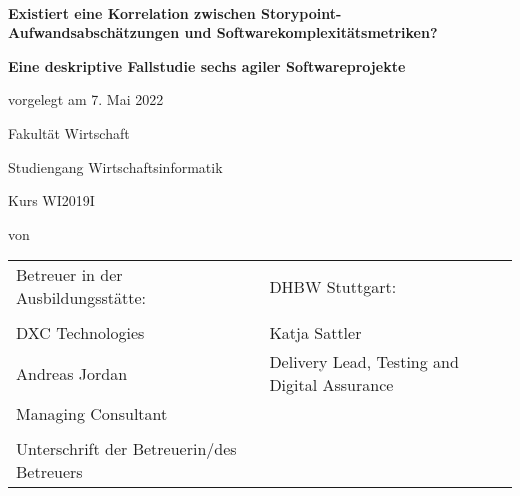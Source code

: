 \begin{spacing}{1}
\begin{center}	
~\vspace{0mm}

{\sffamily
\Large
\textbf{Existiert eine Korrelation zwischen Storypoint-Aufwandsabschätzungen und Softwarekomplexitätsmetriken? }

\bigskip
\textbf{Eine deskriptive Fallstudie sechs agiler Softwareprojekte}
}


\vspace{15mm}

{\Large \typMeinerArbeit}

\vspace{1cm}

vorgelegt am 7. Mai 2022

\vspace{15mm}

Fakultät Wirtschaft
\medskip

Studiengang Wirtschaftsinformatik
\medskip

Kurs WI2019I 

\vspace{10mm}

von

\vspace{10mm}

{\large\textsc{\meinName}}

\vspace{10mm}
\end{center}

\vfill

\begin{tabular}{ll}
Betreuer in der Ausbildungsstätte: & DHBW Stuttgart: \\
\hspace{0.4\linewidth} & \\
DXC Technologies & Katja Sattler \\
Andreas Jordan & Delivery Lead, Testing and Digital Assurance \\
Managing Consultant \\
\\
Unterschrift der Betreuerin/des Betreuers \\
\end{tabular}


\vspace{1cm}
\end{spacing}

